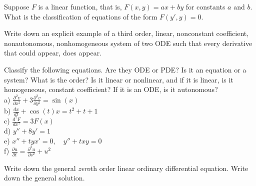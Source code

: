 \documentclass[12pt]{book}
\begin{document}
\begin{exercise}
Suppose $F$ is a linear function, that is,
$F(x,y) = ax+by$ for constants $a$ and $b$.  What is the
classification of equations of the form $F(y',y) = 0$.
\end{exercise}

\begin{exercise}
Write down an explicit example of a third order, linear, nonconstant coefficient,
nonautonomous, nonhomogeneous system of two ODE such that every derivative
that could appear, does appear.
\end{exercise}

\setcounter{exercise}{100}

\begin{exercise}
Classify the following equations.  Are they ODE or PDE?  Is it an equation
or a system?  What is the order?  Is it linear or nonlinear, and if it is
linear, is it homogeneous, constant coefficient?  If it is an ODE, is it
autonomous?\\[3pt]
a) $\displaystyle \frac{\partial^2 v}{\partial x^2} + 3 \frac{\partial^2
v}{\partial y^2} = \sin(x)$ \\[3pt]
b) $\displaystyle \frac{d x}{dt} + \cos(t) x = t^2+t+1$ \\[3pt]
c) $\displaystyle \frac{d^7 F}{dx^7} = 3F(x)$ \\[3pt]
d) $\displaystyle y''+8y'=1$ \\[3pt]
e) $\displaystyle x''+tyx'=0, \quad y''+txy = 0$ \\[3pt]
f) $\displaystyle \frac{\partial u}{\partial t} = \frac{\partial^2 u}{\partial s^2} + u^2$
\end{exercise}

\begin{exercise}
Write down the general \emph{zero}th order linear ordinary differential
equation.  Write down the general solution.
\end{exercise}
\end{document}
